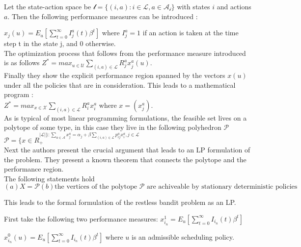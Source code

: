 Let the state-action space be  $\mathcal{l} = \{(i,a): i \in \mathcal{L}, a \in  \mathcal{A_i} \}$
with states $i$ and actions $a$. Then the following performance measures can be introduced :

$x_j(u) = E_u[\sum_{t=0}^{\infty}I_j^a(t) \beta^t]$ where $I_j^a = 1$ if an action is taken at the time step t in the state j, and 0 otherwise. \\

The optimization process that follows from the performance measure introduced is as follows 
$Z^* = max_{u \in \mathcal{U}} \sum_{(i,a) \in \mathcal{L}} R_j^a x_j^a(u)$.  \\

Finally they show the explicit performance region spanned by the vectors $x(u)$ under all the policies that are in consideration. This leads to a mathematical program : \\

$Z^* = max_{x \in \mathcal{X}}\sum_{(i,a)\in \mathcal{L}}R_i^a x_i^a$ where $x = (x_j^a)$. \\

As is typical of most linear programming formulations, the feasible set lives on a polytope of some type, in this case they live in the following polyhedron $\mathcal {P}$ \\

$\mathcal{P} = \{ x \in R_+^{|\mathcal{L}| \}: \sum_{a \in \mathcal{A}} x_j^a = \alpha_j 
+ \beta \sum_{(i,a) \in \mathcal{L}} p_{ij}^a x_i^a, j  \in \mathcal{L} }$ \\

Next the authors present the crucial argument that leads to an LP formulation of the problem.
They present a known theorem that connects the polytope and the performance region.\\

The following statements hold
\begin{equation}
(a) X = \mathcal{P}
(b)\text{the vertices of the polytope } \mathcal{P} \text{ are achiveable by stationary deterministic policies}
\end{equation}

This leads to the formal formulation of the restless bandit problem as an LP.

First take the following two performance measures:
$x_{i_n}^1 = E_u[\sum_{t=0}^{\infty} I_{i_n}(t)\beta^t]$ 

$x_{i_n}^0(u) = E_u[\sum_{t=0}^{\infty}I_{i_n}(t) \beta^t]$ where $u$ is an admissible scheduling policy.  \\

